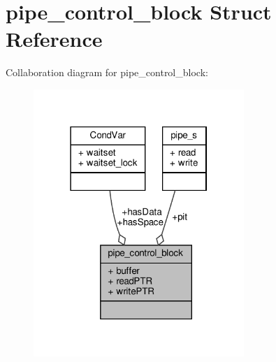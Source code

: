 \hypertarget{structpipe__control__block}{}\section{pipe\+\_\+control\+\_\+block Struct Reference}
\label{structpipe__control__block}


Collaboration diagram for pipe\+\_\+control\+\_\+block\+:
\nopagebreak
\begin{figure}[H]
\begin{center}
\leavevmode
\includegraphics[width=226pt]{structpipe__control__block__coll__graph}
\end{center}
\end{figure}
